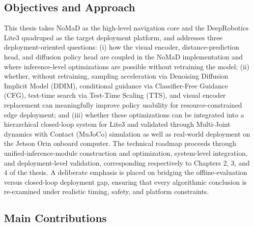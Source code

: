 \begin{digest}[en]
\subsection*{Objectives and Approach}

This thesis takes NoMaD as the high-level navigation core and the DeepRobotics Lite3
quadruped as the target deployment platform, and addresses three deployment-oriented
questions: (i) how the visual encoder, distance-prediction head, and diffusion policy
head are coupled in the NoMaD implementation and where inference-level optimizations
are possible without retraining the model; (ii) whether, without retraining, sampling
acceleration via Denoising Diffusion Implicit Model (DDIM), conditional guidance via Classifier-Free Guidance (CFG),
test-time search via Test-Time Scaling (TTS), and visual encoder replacement can
meaningfully improve policy usability for resource-constrained edge deployment; and
(iii) whether these optimizations can be integrated into a hierarchical closed-loop
system for Lite3 and validated through Multi-Joint dynamics with Contact (MuJoCo) simulation as well as real-world
deployment on the Jetson Orin onboard computer. The technical roadmap proceeds through
unified-inference-module construction and optimization, system-level integration, and deployment-level
validation, corresponding respectively to Chapters 2, 3, and 4 of the thesis. A
deliberate emphasis is placed on bridging the offline-evaluation versus closed-loop
deployment gap, ensuring that every algorithmic conclusion is re-examined under
realistic timing, safety, and platform constraints.

\subsection*{Main Contributions}


\end{digest}
